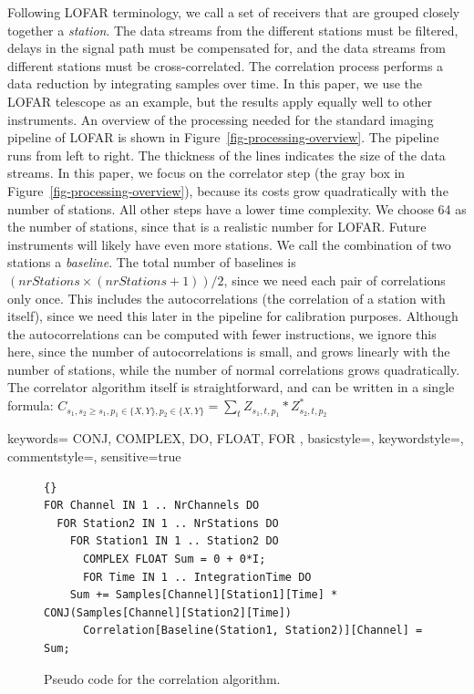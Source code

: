 \documentclass{article}
\begin{document}
Following LOFAR terminology, we call a set of receivers that are grouped closely
together a \emph{station}. The data streams from the different
stations must be filtered, delays in the signal path must be
compensated for, and the data streams from different stations must be
cross-correlated. The correlation process performs a data reduction by
integrating samples over time. In this paper, we use the LOFAR
telescope as an example, but the results apply equally well
to other instruments. An overview of the processing needed for the
standard imaging pipeline of LOFAR is shown in
Figure~\ref{fig-processing-overview}. The pipeline runs from left to right.
The thickness of the lines indicates the size of the data streams.
In this paper, we focus on the
correlator step (the gray box in
Figure~\ref{fig-processing-overview}), because its costs grow
quadratically with the number of stations. All other steps have a
lower time complexity. We choose 64 as the number of stations, since
that is a realistic number for LOFAR.  Future instruments will likely
have even more stations. We call the combination of two stations a
\emph{baseline}.  The total number of baselines is $(nrStations \times
(nrStations + 1)) / 2$, since we need each pair of correlations only
once. This includes the autocorrelations (the correlation of a station with itself),
since we need this later in the pipeline for calibration purposes.
Although the autocorrelations can be computed with fewer instructions, we 
ignore this here, since the number of autocorrelations is small, and grows
linearly with the number of stations, while the number of normal correlations
grows quadratically.
The correlator algorithm itself is straightforward, and can be
written in a single formula:
$C_{s_1,s_2\geq s_1,p_1\in\{X,Y\},p_2\in\{X,Y\}} = \displaystyle\sum_{t} Z_{s_1,t,p_1} * Z_{s_2,t,p_2}^\ast$ 


{
    keywords=
    {
	CONJ,
	COMPLEX,
	DO,
	FLOAT,
	FOR
    },
    basicstyle={\fontsize{7}{8pt}\selectfont},
    keywordstyle={\fontsize{7}{8pt}\selectfont},
    commentstyle={\fontsize{7}{8pt}\selectfont},
    sensitive=true
}
\begin{figure}[t]
\lstset{language=pseudo}
\begin{lstlisting}{}
FOR Channel IN 1 .. NrChannels DO
  FOR Station2 IN 1 .. NrStations DO
    FOR Station1 IN 1 .. Station2 DO
      COMPLEX FLOAT Sum = 0 + 0*I;
      FOR Time IN 1 .. IntegrationTime DO
	Sum += Samples[Channel][Station1][Time] * CONJ(Samples[Channel][Station2][Time])
      Correlation[Baseline(Station1, Station2)][Channel] = Sum;
\end{lstlisting}
\vspace{-0.5cm}
\caption{Pseudo code for the correlation algorithm.}
\label{correlator-code}
\end{figure}
\end{document}
